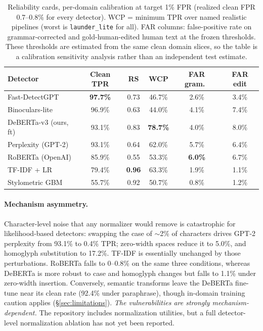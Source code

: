 \documentclass[11pt]{article}
\begin{document}
\begin{table}[t]
\centering
\small
\begin{tabular}{lccccc}
\toprule
Detector & Clean TPR & RS & WCP & FAR gram.\ & FAR edit \\
\midrule
Fast-DetectGPT        & \textbf{97.7\%} & 0.73 & 46.7\% & 2.6\% & 3.4\% \\
Binoculars-lite       & 96.9\% & 0.63 & 44.0\% & 4.1\% & 7.4\% \\
DeBERTa-v3 (ours, ft) & 93.1\% & 0.83 & \textbf{78.7\%} & 4.0\% & 8.0\% \\
Perplexity (GPT-2)    & 93.1\% & 0.64 & 62.0\% & 5.7\% & 6.4\% \\
RoBERTa (OpenAI)      & 85.9\% & 0.55 & 53.3\% & \textbf{6.0\%} & 6.7\% \\
TF-IDF + LR           & 79.4\% & \textbf{0.96} & 63.3\% & 1.9\% & 1.1\% \\
Stylometric GBM       & 55.7\% & 0.92 & 50.7\% & 0.8\% & 1.2\% \\
\bottomrule
\end{tabular}
\caption{Reliability cards, per-domain calibration at target 1\% FPR (realized
clean FPR 0.7--0.8\% for every detector). WCP = minimum TPR over named
realistic pipelines (worst is \texttt{launder\_lite} for all). FAR columns:
false-positive rate on grammar-corrected and gold-human-edited human text at
the frozen thresholds. These thresholds are estimated from the same clean
domain slices, so the table is a calibration sensitivity analysis rather than
an independent test estimate.}
\label{tab:leaderboard}
\end{table}

\paragraph{Mechanism asymmetry.} Character-level noise that any normalizer
would remove is catastrophic for likelihood-based detectors: swapping the case
of $\sim$2\% of characters drives GPT-2 perplexity from 93.1\% to 0.4\% TPR;
zero-width spaces reduce it to 5.0\%, and homoglyph substitution to 17.2\%.
TF-IDF is essentially unchanged by those perturbations. RoBERTa falls to
0--0.8\% on the same three conditions, whereas DeBERTa is more robust to case
and homoglyph changes but falls to 1.1\% under zero-width insertion. Conversely,
semantic transforms leave the DeBERTa fine-tune near its clean rate (92.4\%
under paraphrase), though in-domain training caution applies
(\S\ref{sec:limitations}). \emph{The vulnerabilities are strongly
mechanism-dependent.} The repository includes normalization utilities, but a
full detector-level normalization ablation has not yet been reported.
\end{document}
